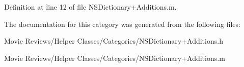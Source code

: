 Definition at line 12 of file N\+S\+Dictionary+\+Additions.\+m.



The documentation for this category was generated from the following files\+:\begin{DoxyCompactItemize}
\item 
Movie Reviews/\+Helper Classes/\+Categories/N\+S\+Dictionary+\+Additions.\+h\item 
Movie Reviews/\+Helper Classes/\+Categories/N\+S\+Dictionary+\+Additions.\+m\end{DoxyCompactItemize}
